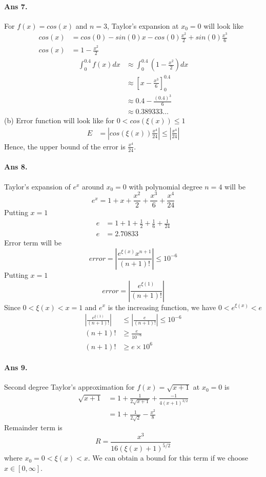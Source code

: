 \documentclass[12pt]{report}
\begin{document}
\paragraph*{Ans 7.} For $f(x) = cos(x)$ and $n = 3$, Taylor's expansion at $x_0 = 0$ will look like
\begin{align*}
    cos(x) &= cos(0) - sin(0)x - cos(0)\frac{x^2}{2} + sin(0)\frac{x^3}{6}\\
    cos(x) &= 1 - \frac{x^2}{2}
\end{align*}
\begin{align*}
    \int_{0}^{0.4} f(x)dx &\approx \int_{0}^{0.4}\left(1 - \frac{x^2}{2}\right) dx\\
    &\approx \left[x - \frac{x^3}{6}\right]_{0}^{0.4}\\
    & \approx 0.4 - \frac{(0.4)^3}{6}\\
    & \approx 0.389333 \dots
\end{align*}
(b) Error function will look like for $0 < cos(\xi(x)) \leq 1$
\begin{align*}
    E &= \left|cos(\xi(x))\frac{x^4}{24}\right| \leq \left|\frac{x^4}{24}\right|
\end{align*} 
Hence, the upper bound of the error is $\frac{x^4}{24}$.

\paragraph*{Ans 8.} Taylor's expansion of $e^x$ around $x_0 = 0$ with polynomial degree $n = 4$ will be
$$ e^x = 1 + x + \frac{x^2}{2} + \frac{x^3}{6} + \frac{x^4}{24} $$
Putting $x = 1$
\begin{align*}
    e &= 1 + 1 + \frac{1}{2} + \frac{1}{6} + \frac{1}{24} \\
    e &= 2.70833
\end{align*}
Error term will be
$$ error = \left|\frac{e^{\xi(x)} x^{n+1}}{(n+1)!}\right| \leq 10^{-6}$$
Putting $x = 1$
$$ error = \left|\frac{e^{\xi(1)}}{(n+1)!}\right| $$
Since $0< \xi(x) < x = 1$ and $e^x$ is the increasing function, we have $ 0 < e^{\xi(x)} < e$ 
\begin{align*}
    \left|\frac{e^{\xi(1)}}{(n+1)!}\right| &\leq \left| \frac{e}{(n+1)!}\right| \leq 10^{-6}\\
    (n+1)! &\geq \frac{e}{10^{-6}}\\
    (n+1)! &\geq e \times 10^6
\end{align*}
\paragraph*{Ans 9.} Second degree Taylor's approximation for $f(x) = \sqrt{x+1}$ at $x_0 = 0$ is 
\begin{align*}
    \sqrt{x+1} &= 1 + \frac{1}{2\sqrt{x+1}} + \frac{-1}{4(x+1)^{3/2}}\\
    &= 1 + \frac{1}{2\sqrt{2}} - \frac{x^2}{8}
\end{align*}
Remainder term is 
$$ R = \frac{x^3}{16(\xi(x)+1)^{5/2}}$$
where $x_0 = 0 < \xi(x) < x$.
We can obtain a bound for this term if we choose $x \in [0, \infty]$.
\end{document}
